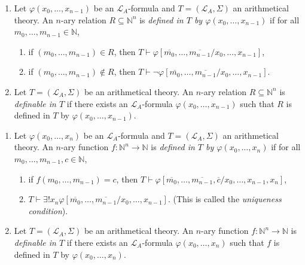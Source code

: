\begin{dfn}
\begin{enumerate}
\item Let $\varphi(x_0, \ldots, x_{n-1})$ be an $\mathcal{L}_A$-formula and $T = (\mathcal{L}_A, \Sigma)$ an arithmetical theory. An $n$-ary relation $R \subseteq \mathbb{N}^n$ is \textit{defined in $T$ by $\varphi(x_0, \ldots, x_{n-1})$} if for all $m_0, \ldots, m_{n-1} \in \mathbb{N}$,
\begin{enumerate}[label=({\arabic*})]
\item if $(m_0, \ldots, m_{n-1}) \in R$, then $T \vdash \varphi[\overline{m_0},\ldots, \overline{m_{n-1}}/x_0,\ldots, x_{n-1}]$,
\item if $(m_0, \ldots, m_{n-1}) \notin R$, then $T \vdash \lnot \varphi[\overline{m_0},\ldots, \overline{m_{n-1}}/x_0,\ldots, x_{n-1}]$.
\end{enumerate}
\item Let $T=(\mathcal{L}_A, \Sigma)$ be an arithmetical theory. An $n$-ary relation $R \subseteq \mathbb{N}^n$ is \textit{definable in $T$} if there exists an $\mathcal{L}_A$-formula $\varphi(x_0, \ldots, x_{n-1})$ such that $R$ is defined in $T$ by $\varphi(x_0, \ldots, x_{n-1})$. 
\end{enumerate}
\end{dfn}

\begin{dfn}
\begin{enumerate}
\item Let $\varphi(x_0, \ldots, x_{n})$ be an $\mathcal{L}_A$-formula and $T = ( \mathcal{L}_A, \Sigma)$ an arithmetical theory. An $n$-ary function $f: \mathbb{N}^n \rightarrow \mathbb{N}$ is \textit{defined in $T$ by $\varphi(x_0, \ldots, x_{n})$} if for all $m_0, \ldots, m_{n-1}, c \in \mathbb{N}$,
\begin{enumerate}[label=({\arabic*})]
\item if $f(m_0, \ldots, m_{n-1})= c$, then $T \vdash \varphi[\overline{m_0},\ldots, \overline{m_{n-1}}, \overline{c}/x_0,\ldots, x_{n-1}, x_{n}]$,
\item $T \vdash \exists ! x_n \varphi [\overline{m_0}, \ldots, \overline{m_{n-1}}/x_0, \ldots, x_{n-1}]$. (This is called the \textit{uniqueness condition}).
\end{enumerate}
\item Let $T=(\mathcal{L}_A, \Sigma)$ be an arithmetical theory. An $n$-ary function $f: \mathbb{N}^n \rightarrow \mathbb{N}$ is \textit{definable in $T$} if there exists an $\mathcal{L}_A$-formula $\varphi(x_0, \ldots, x_{n})$ such that $f$ is defined in $T$ by $\varphi(x_0, \ldots, x_{n})$. 
\end{enumerate}
\end{dfn}

